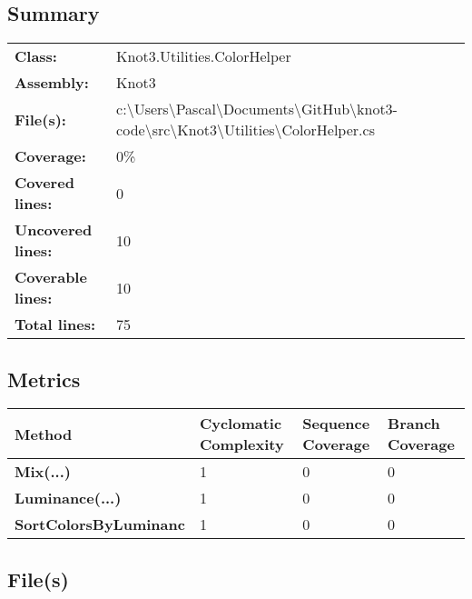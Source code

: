 \documentclass[a4paper,10pt]{article}
\begin{document}
\subsection{Summary}
\begin{longtable}[l]{ll}
\textbf{Class:} & Knot3.Utilities.ColorHelper\\
\textbf{Assembly:} & Knot3\\
\textbf{File(s):} & \begin{minipage}[t]{12cm}{c:\textbackslash Users\textbackslash Pascal\textbackslash Documents\textbackslash GitHub\textbackslash knot3-code\textbackslash src\textbackslash Knot3\textbackslash Utilities\textbackslash ColorHelper.cs}\end{minipage} \\
\textbf{Coverage:} & 0\%\\
\textbf{Covered lines:} & 0\\
\textbf{Uncovered lines:} & 10\\
\textbf{Coverable lines:} & 10\\
\textbf{Total lines:} & 75\\
\end{longtable}
\subsection{Metrics}
\begin{longtable}[l]{|l|l|l|l|}
\hline
\textbf{Method} & \textbf{Cyclomatic Complexity} & \textbf{Sequence Coverage} & \textbf{Branch Coverage}\\
\hline
\textbf{Mix(...)} & 1 & 0 & 0\\
\hline
\textbf{Luminance(...)} & 1 & 0 & 0\\
\hline
\textbf{SortColorsByLuminanc} & 1 & 0 & 0\\
\hline
\end{longtable}
\subsection{File(s)}
\end{document}
